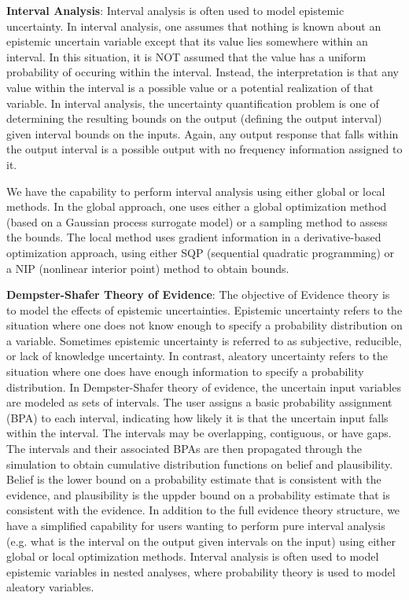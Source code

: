 \textbf{Interval Analysis}: Interval analysis is often used to model 
epistemic uncertainty. In interval analysis, one assumes that nothing 
is known about an epistemic uncertain variable except that its value lies 
somewhere within an interval.  In this situation, it is NOT 
assumed that the value has a uniform probability of occuring 
within the interval.  Instead, the interpretation is that 
any value within the interval is a possible value or a potential 
realization of that variable.  In interval analysis, the 
uncertainty quantification problem is one of determining the 
resulting bounds on the output (defining the output interval) 
given interval bounds on the inputs. Again, any output response 
that falls within the output interval is a possible output 
with no frequency information assigned to it.

We have the capability to perform interval analysis using either
global or local methods. In the global approach, one uses either a 
global optimization method (based on a Gaussian process surrogate model)
or a sampling method to assess the bounds. The
local method uses gradient information in a derivative-based 
optimization approach, using either SQP (sequential quadratic 
programming) or a NIP (nonlinear interior point) method to obtain bounds. 
 
\textbf{Dempster-Shafer Theory of Evidence}: The objective of Evidence
theory is to model the effects of epistemic uncertainties.  Epistemic
uncertainty refers to the situation where one does not know enough
to specify a probability distribution on a variable.  Sometimes epistemic
uncertainty is referred to as subjective, reducible, or lack of knowledge
uncertainty.  In contrast, aleatory uncertainty refers to the situation
where one does have enough information to specify a probability distribution.
In Dempster-Shafer theory of evidence, the uncertain input variables
are modeled as sets of intervals.  The user assigns a basic probability
assignment (BPA) to each interval, indicating how likely it is that the
uncertain input falls within the interval.  The intervals may be
overlapping, contiguous, or have gaps.  The intervals and their associated
BPAs are then propagated through the simulation to obtain cumulative
distribution functions on belief and plausibility.  Belief is the lower
bound on a probability estimate that is consistent with the evidence, and
plausibility is the uppder bound on a probability estimate that is consistent
with the evidence. In addition to the full evidence theory structure, 
we have a simplified capability for users wanting to perform pure 
interval analysis (e.g. what is the interval on the output given 
intervals on the input) using either global or local optimization methods. 
Interval analysis is often used to model epistemic variables in 
nested analyses, where probability theory is used to model aleatory variables.

